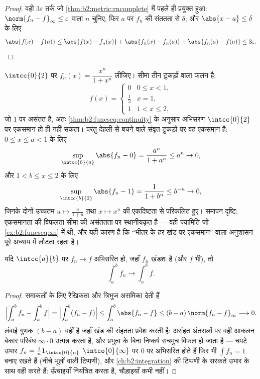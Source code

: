 \begin{proof}
वही $3\varepsilon$ तर्क जो \cref{thm:b2:metric:rncomplete} में पहले ही प्रयुक्त हुआ: $\norm{f_n -
f}_\infty \leq \varepsilon$ वाला $n$ चुनिए, फिर
$a$ पर $f_n$ की संततता से $\delta$; और $\abs{x - a} \leq \delta$ के लिए
\[
\abs{f(x) - f(a)} \leq \abs{f(x) - f_n(x)} + \abs{f_n(x) - f_n(a)}
+ \abs{f_n(a) - f(a)} \leq 3\varepsilon . \qedhere
\]
\end{proof}

\begin{example}[एकसमानता ठीक वहीं विफल होती है जहाँ सीमा टूटती है]\label{ex:b2:funcseq:threshold}
$\intcc{0}{2}$ पर $f_n(x) = \dfrac{x^n}{1 + x^n}$ लीजिए।  सीमा तीन टुकड़ों वाला फलन है:
\[
f(x) = \begin{cases} 0 & 0 \leq x < 1,\\[2pt]
\tfrac12 & x = 1,\\[2pt]
1 & 1 < x \leq 2, \end{cases}
\]
जो $1$ पर असंतत है, अतः \cref{thm:b2:funcseq:continuity} के अनुसार अभिसरण $\intcc{0}{2}$ पर एकसमान हो ही नहीं
सकता। परंतु देहली से बचने वाले संवृत टुकड़ों पर वह एकसमान है: $0 \leq x \leq
a < 1$ के लिए
\[
\sup_{\intcc{0}{a}}\abs{f_n - 0}
= \frac{a^n}{1 + a^n} \leq a^n \to 0 ,
\]
और $1 < b \leq x \leq 2$ के लिए
\[
\sup_{\intcc{b}{2}}\abs{f_n - 1}
= \frac{1}{1 + b^n} \leq b^{-n} \to 0 ,
\]
जिनके दोनों उच्चतम $u \mapsto
\frac{u}{1+u}$ तथा $x \mapsto x^n$ की एकदिष्टता से परिकलित हुए। समापन
दृष्टि: एकसमानता की विफलता सीमा की असंततता पर स्थानीयकृत है --- वही
ज्यामिति जो \cref{ex:b2:funcseq:xn} में थी, और यही कारण है कि ``भीतर के हर खंड पर एकसमान''
वाला अनुशासन पूरे अध्याय में लौटता रहता है।
\end{example}

\begin{theorem}[किसी खंड पर समाकलन]\label{thm:b2:funcseq:integration}
यदि $\intcc{a}{b}$ पर $f_n \to f$  अभिसरित हो, जहाँ $f_n$ खंडशः  है (और $f$
भी), तो
\[
\int_a^b f_n \longrightarrow \int_a^b f .
\]
\end{theorem}

\begin{proof}
समाकलों के लिए रैखिकता और त्रिभुज असमिका देती हैं
\[
\Bigl|\int_a^b f_n - \int_a^b f\Bigr|
= \Bigl|\int_a^b (f_n - f)\Bigr|
\leq \int_a^b\abs{f_n - f}
\leq (b - a)\,\norm{f_n - f}_\infty \longrightarrow 0 .
\]
लंबाई गुणक $(b - a)$ वहीं है जहाँ खंड की संहतता प्रवेश करती है: असंहत अंतरालों
पर वही आकलन बेकार परिबंध $\infty\cdot0$ उत्पन्न करता है, और प्रभुत्व के बिना निष्कर्ष
सचमुच विफल हो जाता है --- चपटे उभार $f_n =
\frac1n\mathbf 1_{\intcc{0}{n}}$ $\intco{0}{\infty}$ पर $0$ पर 
अभिसरित होते हैं फिर भी $\int f_n = 1$ बनाए रखते हैं (नीचे भूलों वाली टिप्पणी), और
\cref{ch:b2:integration} की टिप्पणी के सरकते उभार  के साथ वही करते हैं:  ऊँचाइयाँ नियंत्रित करता है, चौड़ाइयाँ कभी नहीं।
\end{proof}

